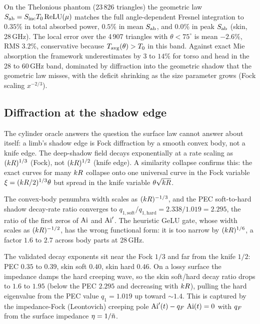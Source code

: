 On the Thelonious phantom (23\,826 triangles) the geometric law
$S_{\mathrm{ab}} = S_{\mathrm{inc}}T_{0}\operatorname{ReLU}(\mu)$ matches the full angle-dependent Fresnel
integration to $0.35\%$ in total absorbed power, $0.5\%$ in mean $S_{\mathrm{ab}}$, and
$0.0\%$ in peak $S_{\mathrm{ab}}$ (skin, 28\,GHz). The local error over the 4\,907
triangles with $\theta<75^\circ$ is mean $-2.6\%$, RMS $3.2\%$, conservative
because $T_{\mathrm{avg}}(\theta)>T_{0}$ in this band. Against exact Mie absorption the
framework underestimates by $3$ to $14\%$ for torso and head in the 28 to
60\,GHz band, dominated by diffraction into the geometric shadow that the
geometric law misses, with the deficit shrinking as the size parameter grows
(Fock scaling $x^{-2/3}$).

\subsection{Diffraction at the shadow edge}
\label{sec:val-diffraction}

The cylinder oracle answers the question the surface law cannot answer about
itself: a limb's shadow edge is Fock diffraction by a smooth convex body, not a
knife edge. The deep-shadow field decays exponentially at a rate scaling as
$(kR)^{1/3}$ (Fock), not $(kR)^{1/2}$ (knife edge). A similarity
collapse confirms this: the exact curves for many $kR$ collapse onto one
universal curve in the Fock variable $\xi = (kR/2)^{1/3}\theta$ but spread
in the knife variable $\theta\sqrt{kR}$.

\begin{proposition}\label{prop:fock}
The convex-body penumbra width scales as $(kR)^{-1/3}$, and the PEC
soft-to-hard shadow decay-rate ratio converges to
$q_{1,\mathrm{soft}}/q_{1,\mathrm{hard}} = 2.338/1.019 = 2.295$, the ratio of
the first zeros of $\operatorname{Ai}$ and $\operatorname{Ai}'$. The heuristic GeLU gate, whose width
scales as $(kR)^{-1/2}$, has the wrong functional form: it is too narrow by
$(kR)^{1/6}$, a factor $1.6$ to $2.7$ across body parts at 28\,GHz.
\end{proposition}

The validated decay exponents sit near the Fock $1/3$ and far from the knife
$1/2$: PEC $0.35$ to $0.39$, skin soft $0.40$, skin hard $0.46$. On a lossy
surface the impedance damps the hard creeping wave, so the skin soft/hard decay
ratio drops to $1.6$ to $1.95$ (below the PEC $2.295$ and decreasing with
$kR$), pulling the hard eigenvalue from the PEC value $q_1 = 1.019$ up
toward $\sim 1.4$. This is captured by the impedance-Fock (Leontovich) creeping
pole $\operatorname{Ai}'(t) - q_{F}\,\operatorname{Ai}(t) = 0$ with $q_{F}$ from the surface impedance
$\eta = 1/\tilde{n}$.

